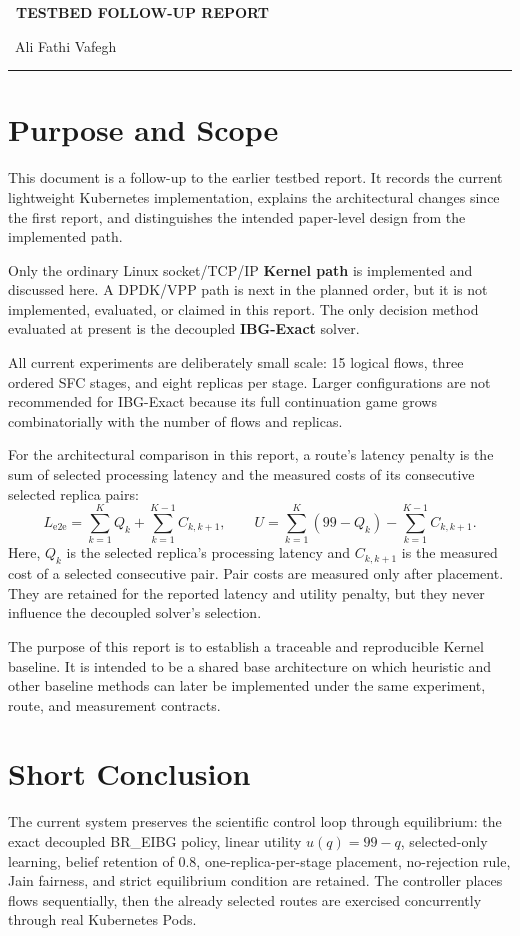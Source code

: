\documentclass[12pt,a4paper]{article}
\makeatletter
\renewcommand{\maketitle}{
  \begin{titlepage}
    \centering
    \vspace*{2cm}
    {\color{titleblue}\Huge\bfseries\MakeUppercase{\ Testbed Follow-Up Report}\par}
    \vspace{1cm}
    {\Large\ Ali Fathi Vafegh\par}
    \vspace{0.5cm}
    \rule{0.5\textwidth}{0.4pt}\par
    \vspace{1cm}
    {\large\@date\par}
    \vfill
  \end{titlepage}
}
\makeatother
\begin{document}
\maketitle
\tableofcontents
\newpage

\section{Purpose and Scope}
This document is a follow-up to the earlier testbed report. It records the current lightweight Kubernetes implementation, explains the architectural changes since the first report, and distinguishes the intended paper-level design from the implemented path.

Only the ordinary Linux socket/TCP/IP \textbf{Kernel path} is implemented and discussed here. A DPDK/VPP path is next in the planned order, but it is not implemented, evaluated, or claimed in this report. The only decision method evaluated at present is the decoupled \textbf{IBG-Exact} solver.

All current experiments are deliberately small scale: 15 logical flows, three ordered SFC stages, and eight replicas per stage. Larger configurations are not recommended for IBG-Exact because its full continuation game grows combinatorially with the number of flows and replicas.

For the architectural comparison in this report, a route's latency penalty is the sum of selected processing latency and the measured costs of its consecutive selected replica pairs:
\[
L_{\mathrm{e2e}}=\sum_{k=1}^{K} Q_k+\sum_{k=1}^{K-1} C_{k,k+1},
\qquad
U=\sum_{k=1}^{K}(99-Q_k)-\sum_{k=1}^{K-1}C_{k,k+1}.
\]
Here, $Q_k$ is the selected replica's processing latency and $C_{k,k+1}$ is the measured cost of a selected consecutive pair. Pair costs are measured only after placement. They are retained for the reported latency and utility penalty, but they never influence the decoupled solver's selection.

The purpose of this report is to establish a traceable and reproducible Kernel baseline. It is intended to be a shared base architecture on which heuristic and other baseline methods can later be implemented under the same experiment, route, and measurement contracts.

\section{Short Conclusion}
The current system preserves the scientific control loop through equilibrium: the exact decoupled BR\_EIBG policy, linear utility $u(q)=99-q$, selected-only learning, belief retention of 0.8, one-replica-per-stage placement, no-rejection rule, Jain fairness, and strict equilibrium condition are retained. The controller places flows sequentially, then the already selected routes are exercised concurrently through real Kubernetes Pods.
\end{document}
